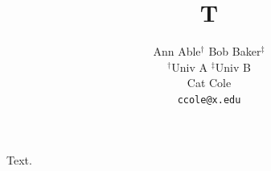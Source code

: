 \documentclass{article}
\title{T}
\author{Ann Able$^{\dagger}$ \quad Bob Baker$^{\ddagger}$ \\ $^\dagger$Univ A \quad $^\ddagger$Univ B \\ Cat Cole \\ \texttt{ccole@x.edu}}
\begin{document}
\maketitle
Text.
\end{document}
